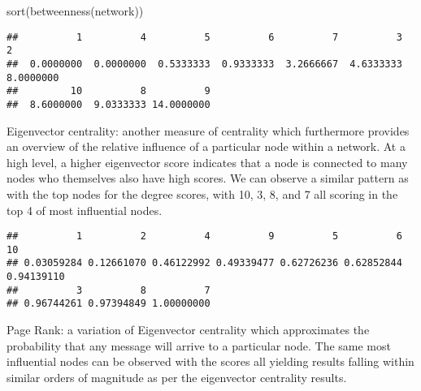\documentclass[
]{article}
\newenvironment{Shaded}{\begin{snugshade}}{\end{snugshade}}
\newcommand{\FunctionTok}[1]{\textcolor[rgb]{0.00,0.00,0.00}{#1}}
\newcommand{\NormalTok}[1]{#1}
\newcommand{\SpecialCharTok}[1]{\textcolor[rgb]{0.00,0.00,0.00}{#1}}
\begin{document}
\begin{Shaded}
\begin{Highlighting}[]
\FunctionTok{sort}\NormalTok{(}\FunctionTok{betweenness}\NormalTok{(network))}
\end{Highlighting}
\end{Shaded}

\begin{verbatim}
##          1          4          5          6          7          3          2 
##  0.0000000  0.0000000  0.5333333  0.9333333  3.2666667  4.6333333  8.0000000 
##         10          8          9 
##  8.6000000  9.0333333 14.0000000
\end{verbatim}

Eigenvector centrality: another measure of centrality which furthermore
provides an overview of the relative influence of a particular node
within a network. At a high level, a higher eigenvector score indicates
that a node is connected to many nodes who themselves also have high
scores. We can observe a similar pattern as with the top nodes for the
degree scores, with 10, 3, 8, and 7 all scoring in the top 4 of most
influential nodes.

\begin{Shaded}
\end{Shaded}

\begin{verbatim}
##          1          2          4          9          5          6         10 
## 0.03059284 0.12661070 0.46122992 0.49339477 0.62726236 0.62852844 0.94139110 
##          3          8          7 
## 0.96744261 0.97394849 1.00000000
\end{verbatim}

Page Rank: a variation of Eigenvector centrality which approximates the
probability that any message will arrive to a particular node. The same
most influential nodes can be observed with the scores all yielding
results falling within similar orders of magnitude as per the
eigenvector centrality results.

\begin{Shaded}
\end{Shaded}
\end{document}
